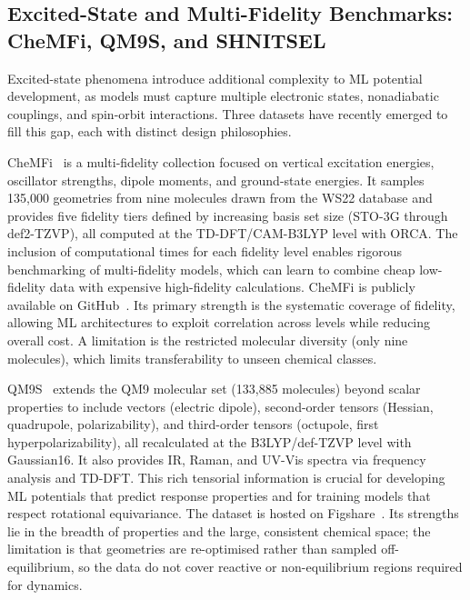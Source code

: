 \documentclass[12pt]{article}
\begin{document}
\subsection{Excited-State and Multi-Fidelity Benchmarks: CheMFi, QM9S, and SHNITSEL}

Excited-state phenomena introduce additional complexity to ML potential development, as models must capture multiple electronic states, nonadiabatic couplings, and spin-orbit interactions. Three datasets have recently emerged to fill this gap, each with distinct design philosophies.

CheMFi~\cite{ds42-11} is a multi-fidelity collection focused on vertical excitation energies, oscillator strengths, dipole moments, and ground-state energies. It samples 135,000 geometries from nine molecules drawn from the WS22 database and provides five fidelity tiers defined by increasing basis set size (STO-3G through def2-TZVP), all computed at the TD-DFT/CAM-B3LYP level with ORCA. The inclusion of computational times for each fidelity level enables rigorous benchmarking of multi-fidelity models, which can learn to combine cheap low-fidelity data with expensive high-fidelity calculations. CheMFi is publicly available on GitHub~\cite{ds42-189}. Its primary strength is the systematic coverage of fidelity, allowing ML architectures to exploit correlation across levels while reducing overall cost. A limitation is the restricted molecular diversity (only nine molecules), which limits transferability to unseen chemical classes.

QM9S~\cite{ds43-37} extends the QM9 molecular set (133,885 molecules) beyond scalar properties to include vectors (electric dipole), second-order tensors (Hessian, quadrupole, polarizability), and third-order tensors (octupole, first hyperpolarizability), all recalculated at the B3LYP/def-TZVP level with Gaussian16. It also provides IR, Raman, and UV-Vis spectra via frequency analysis and TD-DFT. This rich tensorial information is crucial for developing ML potentials that predict response properties and for training models that respect rotational equivariance. The dataset is hosted on Figshare~\cite{ds43-190}. Its strengths lie in the breadth of properties and the large, consistent chemical space; the limitation is that geometries are re-optimised rather than sampled off-equilibrium, so the data do not cover reactive or non-equilibrium regions required for dynamics.
\end{document}
